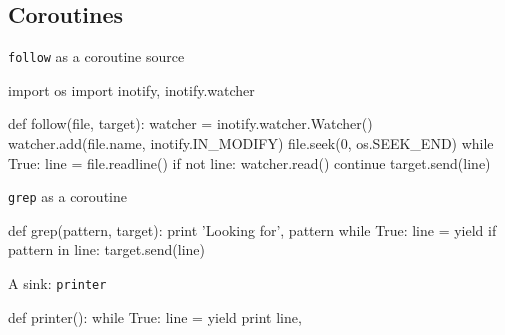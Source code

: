\documentclass{beamer}
\newcommand{\lra}{\ensuremath{\longrightarrow}}
\begin{document}
\subsection{Coroutines}


\begin{frame}[fragile]{\texttt{follow} as a coroutine source}
\begin{semiverbatim}
import os
import inotify, inotify.watcher

def follow(file\alert<2>{, target}):
    watcher = inotify.watcher.Watcher()
    watcher.add(file.name, inotify.IN_MODIFY)
    file.seek(0, os.SEEK_END)
    while True:
        line = file.readline()
        if not line:
            watcher.read()
            continue
        \alert<2>{target.send(line)}
\end{semiverbatim}
\end{frame}

\begin{frame}[fragile]{\texttt{grep} as a coroutine}
  \begin{semiverbatim}
    def grep(pattern\alert<2>{, target}):
        print 'Looking for', pattern
        while True:
            \alert<2>{line = yield}
            if pattern in line:
                \alert<2>{target.send(line)}
  \end{semiverbatim}
\end{frame}

\begin{frame}[fragile]{A sink: \texttt{printer}}
  \begin{pycode}
    def printer():
        while True:
            line = yield
            print line,
  \end{pycode}
\end{frame}
\end{document}
